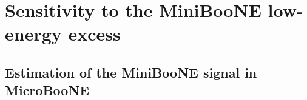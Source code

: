 \section{Sensitivity to the MiniBooNE low-energy excess}\label{sec:sensitivity}
\subsection{Estimation of the MiniBooNE signal in MicroBooNE}
